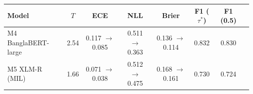 \begin{tabular}{@{}lccccccc@{}}
\toprule
Model & $T$ & ECE & NLL & Brier & F1 ($\tau^*$) & F1 (0.5) \\
\midrule
M4 BanglaBERT-large & 2.54 & 0.117 $\rightarrow$ 0.085 & 0.511 $\rightarrow$ 0.363 & 0.136 $\rightarrow$ 0.114 & 0.832 & 0.830 \\
M5 XLM-R (MIL) & 1.66 & 0.071 $\rightarrow$ 0.038 & 0.512 $\rightarrow$ 0.475 & 0.168 $\rightarrow$ 0.161 & 0.730 & 0.724 \\
\bottomrule
\end{tabular}